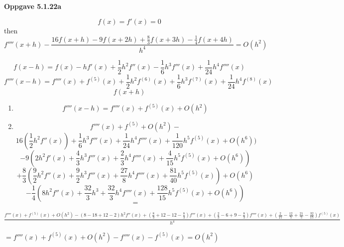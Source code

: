 \documentclass[11pt]{article}
\begin{document}
    \textbf{Oppgave 5.1.22a}

    \[f(x) = f'(x) = 0\]
    then
    \[f''''(x+h) - \frac{16f(x+h) - 9f(x+2h) + \frac{8}{3}f(x+3h)-\frac{1}{4}f(x+4h)}{h^4}=O(h^2)\]

    \[f(x-h)=f(x)-hf'(x) + \frac{1}{2}h^2f''(x)-\frac{1}{6}h^3f'''(x)+\frac{1}{24}h^4f''''(x)\]
    \[f''''(x-h) = f''''(x) + f^{(5)}(x) + \frac{1}{2}h^2f^{(6)}(x)+\frac{1}{6}h^3f^{(7)}(x)+\frac{1}{24}h^4f^{(8)}(x)\]
    \[f(x+h)\]
    \begin{enumerate}
    \item  \[f''''(x-h) = f''''(x) + f^{(5)}(x) + O(h^2)\]
    \item \[f''''(x) + f^{(5)} + O(h^2)-\]
    \[16(\frac{1}{2}h^2f''(x))+\frac{1}{6}h^3f'''(x)+\frac{1}{24}h^4f''''(x)+\frac{1}{120}h^5f^{(5)}(x)+O(h^6))\]
    \[-9(2h^2f'(x)+\frac{4}{3}h^3f'''(x)+\frac{2}{3}h^4f''''(x)+\frac{4}{15}h^5f^{(5)}(x)+O(h^6))\]
    \[+\frac{8}{3}(\frac{9}{2}h^2f''(x)+\frac{9}{2}h^3f'''(x)+\frac{27}{8}h^4f''''(x) + \frac{81}{40}h^5f^{(5)}(x))+O(h^6)\]
    \[-\frac{1}{4}(8h^2f''(x)+\frac{32}{3}h^3+\frac{32}{3}h^4f''''(x)+\frac{128}{15}h^5f^{(5)}(x)+O(h^6))\]
    \[= \]
    
    \end{enumerate}

    \begin{flushleft}
        
   
    $\frac{f''''(x) + f^{(5)}(x) + O(h^2) - (8-18+12-2)h^2f''(x)+(\frac{8}{3}+12-12-\frac{8}{3})f'''(x) + (\frac{2}{3}-6+9-\frac{8}{3}) f''''(x)+(\frac{2}{15}-\frac{12}{5}+\frac{21}{5} - \frac{32}{15})f^{(5)}(x)}{h^4}$
    
    $= f''''(x)+f^{(5)}(x)+O(h^2) - f''''(x) - f^{(5)}(x) = O(h^2)$
    
    
    \end{flushleft}

    
   

    

        

        
\end{document}
